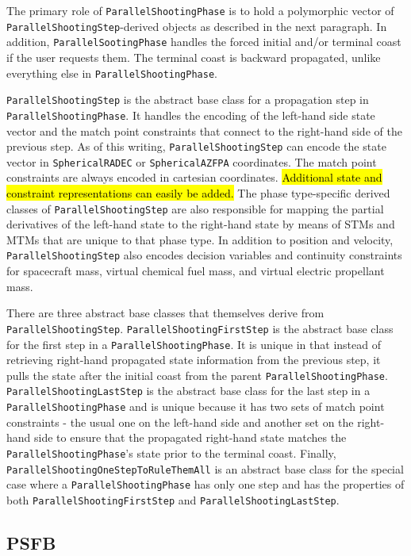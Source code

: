 The primary role of \texttt{ParallelShootingPhase} is to hold a polymorphic vector of \texttt{ParallelShootingStep}-derived objects as described in the next paragraph. In addition, \texttt{ParallelSootingPhase} handles the forced initial and/or terminal coast if the user requests them. The terminal coast is backward propagated, unlike everything else in \texttt{ParallelShootingPhase}.

\texttt{ParallelShootingStep} is the abstract base class for a propagation step in \texttt{ParallelShootingPhase}. It handles the encoding of the left-hand side state vector and the match point constraints that connect to the right-hand side of the previous step. As of this writing, \texttt{ParallelShootingStep} can encode the state vector in \texttt{SphericalRADEC} or \texttt{SphericalAZFPA} coordinates. The match point constraints are always encoded in cartesian coordinates. \hl{Additional state and constraint representations can easily be added.} The phase type-specific derived classes of \texttt{ParallelShootingStep} are also responsible for mapping the partial derivatives of the left-hand state to the right-hand state by means of \ac{STM}s and \ac{MTM}s that are unique to that phase type. In addition to position and velocity, \texttt{ParallelShootingStep} also encodes decision variables and continuity constraints for spacecraft mass, virtual chemical fuel mass, and virtual electric propellant mass.

There are three abstract base classes that themselves derive from \texttt{ParallelShootingStep}. \texttt{ParallelShootingFirstStep} is the abstract base class for the first step in a \texttt{ParallelShootingPhase}. It is unique in that instead of retrieving right-hand propagated state information from the previous step, it pulls the state after the initial coast from the parent \texttt{ParallelShootingPhase}. \texttt{ParallelShootingLastStep} is the abstract base class for the last step in a \texttt{ParallelShootingPhase} and is unique because it has two sets of match point constraints - the usual one on the left-hand side and another set on the right-hand side to ensure that the propagated right-hand state matches the \texttt{ParallelShootingPhase}'s state prior to the terminal coast. Finally, \texttt{ParallelShootingOneStepToRuleThemAll} is an abstract base class for the special case where a \texttt{ParallelShootingPhase} has only one step and has the properties of both \texttt{ParallelShootingFirstStep} and \texttt{ParallelShootingLastStep}.

\subsection{PSFB}
\label{subsec:PSFB}

